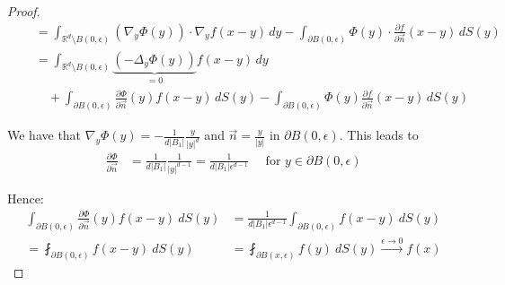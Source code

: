 \documentclass{report}
\theoremstyle{tommy}
\begin{document}
\begin{proof}
\begin{align*}
    &\quad = \int_{\mathbb{R}^d \setminus B(0, \epsilon)} (\nabla_y \Phi(y)) \cdot \nabla_y f(x-y) \, dy - \int_{\partial B(0, \epsilon)} \Phi(y) \cdot  \frac{\partial f}{\partial \vec{n}}(x-y) \, dS(y) \\
    &\quad = \int_{\mathbb{R}^d \setminus B(0, \epsilon)} \underbrace{(-\Delta_y \Phi(y))}_{=0} f(x-y) \, dy \\ &\qquad + \int_{\partial B(0, \epsilon)} \frac{\partial \Phi}{\partial \vec{n}}(y) f(x-y) \, dS(y) - \int_{\partial B(0, \epsilon)} \Phi(y) \frac{\partial f}{\partial \vec{n}}(x-y) \, dS(y)
  \end{align*}

  We have that \(\nabla_y \Phi(y) = -\frac{1}{d |B_1|} \frac{y}{|y|^d}\) and \( \vec{n} = \frac{y}{|y|} \text{ in } \partial B(0, \epsilon)\). This leads to
    \begin{align*}
      \frac{\partial \Phi}{\partial \vec{n}} &= \frac{1}{d |B_1|} \frac{1}{|y|^{d-1}} = \frac{1}{d |B_1| \epsilon^{d-1}} \quad \text{ for } y \in \partial B(0, \epsilon)
    \end{align*}

    Hence:
    \begin{align*}
      \int_{\partial B(0, \epsilon)} \frac{\partial \Phi}{\partial \vec{n}}(y) f(x-y) \ dS(y) 
      &= \frac{1}{d |B_1| \epsilon^{d-1}} \int_{\partial B(0, \epsilon)} f(x-y) \ dS(y) \\
      = \fint_{\partial B(0, \epsilon)} f(x-y) \ dS(y)
      &= \fint_{\partial B(x, \epsilon)} f(y) \ dS(y) 
      \xrightarrow{\epsilon \to 0} f(x)
    \end{align*}


\end{proof}
\end{document}
